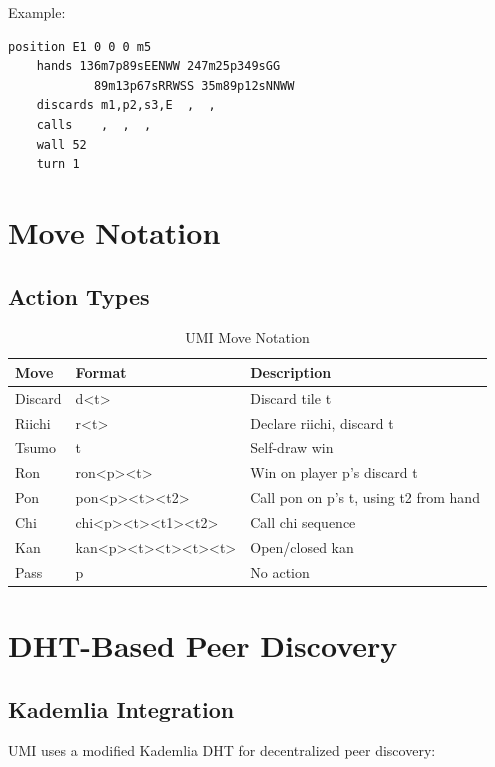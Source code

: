 \documentclass[11pt,a4paper]{article}
\begin{document}
Example:
\begin{lstlisting}
position E1 0 0 0 m5
    hands 136m7p89sEENWW 247m25p349sGG
            89m13p67sRRWSS 35m89p12sNNWW
    discards m1,p2,s3,E  ,  ,  
    calls    ,  ,  ,  
    wall 52
    turn 1
\end{lstlisting}

\section{Move Notation}

\subsection{Action Types}

\begin{table}[h]
\centering
\begin{tabular}{lll}
\toprule
\textbf{Move} & \textbf{Format} & \textbf{Description} \\
\midrule
Discard & d<t> & Discard tile t \\
Riichi & r<t> & Declare riichi, discard t \\
Tsumo & t & Self-draw win \\
Ron & ron<p><t> & Win on player p's discard t \\
Pon & pon<p><t><t2> & Call pon on p's t, using t2 from hand \\
Chi & chi<p><t><t1><t2> & Call chi sequence \\
Kan & kan<p><t><t><t><t> & Open/closed kan \\
Pass & p & No action \\
\bottomrule
\end{tabular}
\caption{UMI Move Notation}
\end{table}

\section{DHT-Based Peer Discovery}

\subsection{Kademlia Integration}

UMI uses a modified Kademlia DHT for decentralized peer discovery:
\end{document}
